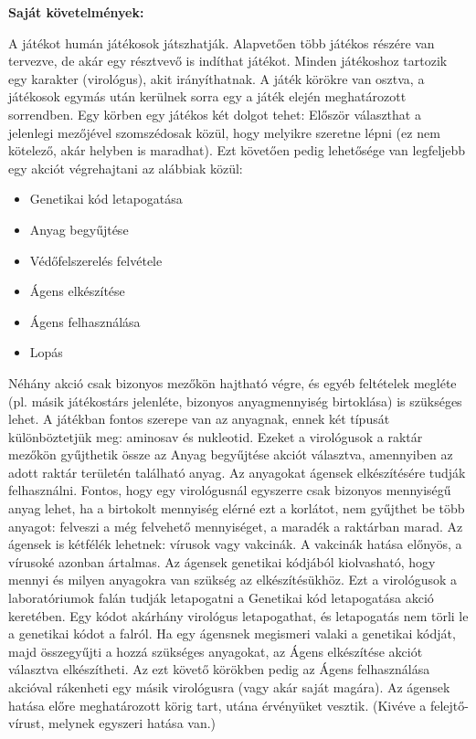 \bigskip

\textbf{Saját követelmények:}

A játékot humán játékosok játszhatják. Alapvetően több játékos részére van tervezve, de akár egy résztvevő is indíthat játékot. Minden játékoshoz tartozik egy karakter (virológus), akit irányíthatnak. A játék körökre van osztva, a játékosok egymás után kerülnek sorra egy a játék elején meghatározott sorrendben. Egy körben egy játékos két dolgot tehet: Először választhat a jelenlegi mezőjével szomszédosak közül, hogy melyikre szeretne lépni (ez nem kötelező, akár helyben is maradhat). Ezt követően pedig lehetősége van legfeljebb egy akciót végrehajtani az alábbiak közül:
\begin{itemize}
	\item Genetikai kód letapogatása
	\item Anyag begyűjtése
	\item Védőfelszerelés felvétele
	\item Ágens elkészítése
	\item Ágens felhasználása
	\item Lopás
\end{itemize}
Néhány akció csak bizonyos mezőkön hajtható végre, és egyéb feltételek megléte (pl. másik játékostárs jelenléte, bizonyos anyagmennyiség birtoklása) is szükséges lehet.
A játékban fontos szerepe van az anyagnak, ennek két típusát különböztetjük meg: aminosav és nukleotid. Ezeket a virológusok a raktár mezőkön gyűjthetik össze az Anyag begyűjtése akciót választva, amennyiben az adott raktár területén található anyag. Az anyagokat ágensek elkészítésére tudják felhasználni.
Fontos, hogy egy virológusnál egyszerre csak bizonyos mennyiségű anyag lehet, ha a birtokolt mennyiség elérné ezt a korlátot, nem gyűjthet be több anyagot: felveszi a még felvehető mennyiséget, a maradék a raktárban marad.
Az ágensek is kétfélék lehetnek: vírusok vagy vakcinák. A vakcinák hatása előnyös, a vírusoké azonban ártalmas. Az ágensek genetikai kódjából kiolvasható, hogy mennyi és milyen anyagokra van szükség az elkészítésükhöz. Ezt a virológusok a laboratóriumok falán tudják letapogatni a Genetikai kód letapogatása akció keretében. Egy kódot akárhány virológus letapogathat, és letapogatás nem törli le a genetikai kódot a falról.
Ha egy ágensnek megismeri valaki a genetikai kódját, majd összegyűjti a hozzá szükséges anyagokat, az Ágens elkészítése akciót választva elkészítheti. Az ezt követő körökben pedig az Ágens felhasználása akcióval rákenheti egy másik virológusra (vagy akár saját magára). Az ágensek hatása előre meghatározott körig tart, utána érvényüket vesztik. (Kivéve a felejtő-vírust, melynek egyszeri hatása van.)
